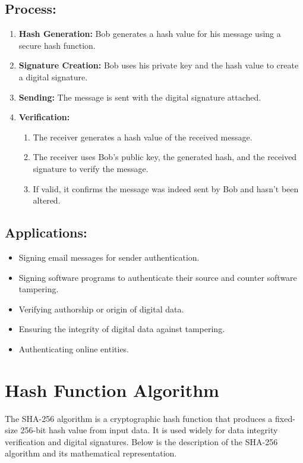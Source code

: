 \subsection{Process:}
\begin{enumerate}
    \item \textbf{Hash Generation:} Bob generates a hash value for his message using a secure hash function.
    \item \textbf{Signature Creation:} Bob uses his private key and the hash value to create a digital signature.
    \item \textbf{Sending:} The message is sent with the digital signature attached.
    \item \textbf{Verification:} \begin{enumerate}
    \item The receiver generates a hash value of the received message.
    \item The receiver uses Bob’s public key, the generated hash, and the received signature to verify the message.
    \item If valid, it confirms the message was indeed sent by Bob and hasn’t been altered.
\end{enumerate}
\end{enumerate}


\subsection{Applications:}
\begin{itemize}
    \item Signing email messages for sender authentication.
    \item Signing software programs to authenticate their source and counter software tampering.
    \item Verifying authorship or origin of digital data.
    \item Ensuring the integrity of digital data against tampering.
    \item Authenticating online entities.
\end{itemize}


\section*{Hash Function Algorithm}

The SHA-256 algorithm is a cryptographic hash function that produces a fixed-size 256-bit hash value from input data. It is used widely for data integrity verification and digital signatures. Below is the description of the SHA-256 algorithm and its mathematical representation.

